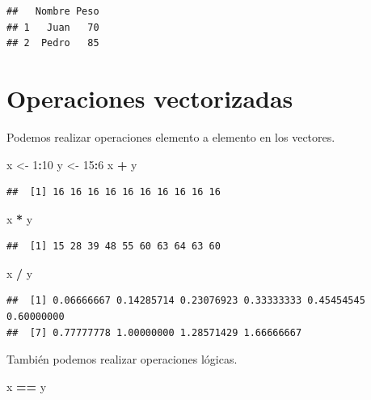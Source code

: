 \documentclass[spanish,]{book}
\newenvironment{Shaded}{\begin{snugshade}}{\end{snugshade}}
\newcommand{\DecValTok}[1]{\textcolor[rgb]{0.00,0.00,0.81}{#1}}
\newcommand{\StringTok}[1]{\textcolor[rgb]{0.31,0.60,0.02}{#1}}
\newcommand{\OperatorTok}[1]{\textcolor[rgb]{0.81,0.36,0.00}{\textbf{#1}}}
\newcommand{\NormalTok}[1]{#1}
\begin{document}
\begin{verbatim}
##   Nombre Peso
## 1   Juan   70
## 2  Pedro   85
\end{verbatim}

\section{Operaciones vectorizadas}\label{operaciones-vectorizadas}

Podemos realizar operaciones elemento a elemento en los vectores.

\begin{Shaded}
\begin{Highlighting}[]
\NormalTok{x <-}\StringTok{ }\DecValTok{1}\OperatorTok{:}\DecValTok{10}
\NormalTok{y <-}\StringTok{ }\DecValTok{15}\OperatorTok{:}\DecValTok{6}
\NormalTok{x }\OperatorTok{+}\StringTok{ }\NormalTok{y}
\end{Highlighting}
\end{Shaded}

\begin{verbatim}
##  [1] 16 16 16 16 16 16 16 16 16 16
\end{verbatim}

\begin{Shaded}
\begin{Highlighting}[]
\NormalTok{x }\OperatorTok{*}\StringTok{ }\NormalTok{y}
\end{Highlighting}
\end{Shaded}

\begin{verbatim}
##  [1] 15 28 39 48 55 60 63 64 63 60
\end{verbatim}

\begin{Shaded}
\begin{Highlighting}[]
\NormalTok{x }\OperatorTok{/}\StringTok{ }\NormalTok{y}
\end{Highlighting}
\end{Shaded}

\begin{verbatim}
##  [1] 0.06666667 0.14285714 0.23076923 0.33333333 0.45454545 0.60000000
##  [7] 0.77777778 1.00000000 1.28571429 1.66666667
\end{verbatim}

También podemos realizar operaciones lógicas.

\begin{Shaded}
\begin{Highlighting}[]
\NormalTok{x }\OperatorTok{==}\StringTok{ }\NormalTok{y}
\end{Highlighting}
\end{Shaded}
\end{document}
